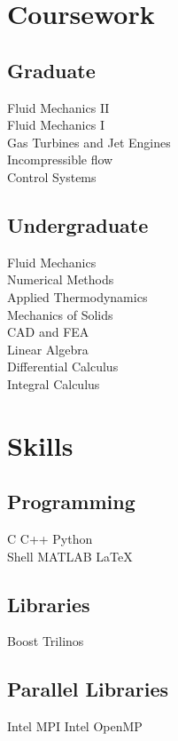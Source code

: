 \documentclass[]{resume}
\begin{document}
\begin{minipage}[t]{0.33\textwidth}

\section{Coursework}
\subsection{Graduate}
Fluid Mechanics II \\
Fluid Mechanics I \\
Gas Turbines and Jet Engines \\
Incompressible flow \\
Control Systems \\
\sectionsep

\subsection{Undergraduate}
Fluid Mechanics \\
Numerical Methods \\
Applied Thermodynamics \\
Mechanics of Solids \\
CAD and FEA \\
Linear Algebra \\
Differential Calculus \\
Integral Calculus \\


\section{Skills}
\subsection{Programming}
C \textbullet{} C++ \textbullet{} Python \textbullet{} \\
Shell \textbullet{} MATLAB \textbullet{} \LaTeX\ \\
\sectionsep
\subsection{Libraries}
Boost \textbullet{} Trilinos \\
\sectionsep
\subsection{Parallel Libraries}
Intel MPI \textbullet{} Intel OpenMP \\
\sectionsep

\end{minipage}
\end{document}
